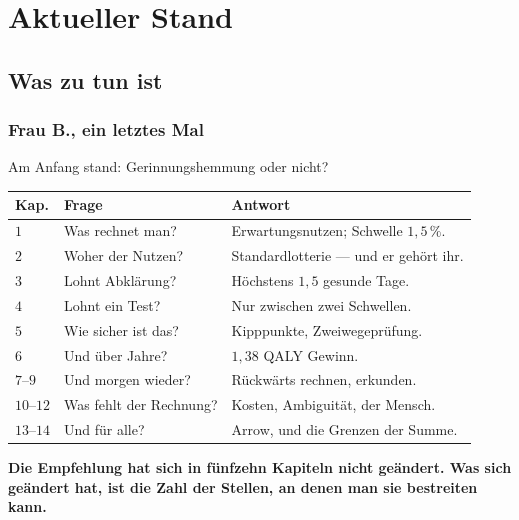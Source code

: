 \part{Aktueller Stand}

\chapter{Was zu tun ist}

\section{Frau B., ein letztes Mal}

\begin{merksatz}
Am Anfang stand: Gerinnungshemmung oder nicht?

\begin{center}
{\small
\renewcommand{\arraystretch}{1.5}
\begin{tabular}{@{}P{1.2cm}P{3.4cm}P{3.6cm}@{}}
\toprule
\textbf{Kap.} & \textbf{Frage} & \textbf{Antwort}\\
\midrule
$1$ & Was rechnet man? & Erwartungsnutzen; Schwelle $1{,}5\,\%$.\\
$2$ & Woher der Nutzen? & Standardlotterie --- und er gehört ihr.\\
$3$ & Lohnt Abklärung? & Höchstens $1{,}5$ gesunde Tage.\\
$4$ & Lohnt ein Test? & Nur zwischen zwei Schwellen.\\
$5$ & Wie sicher ist das? & Kipppunkte, Zweiwegeprüfung.\\
$6$ & Und über Jahre? & $1{,}38$ QALY Gewinn.\\
$7$--$9$ & Und morgen wieder? & Rückwärts rechnen, erkunden.\\
$10$--$12$ & Was fehlt der Rechnung? & Kosten, Ambiguität, der Mensch.\\
$13$--$14$ & Und für alle? & Arrow, und die Grenzen der Summe.\\
\bottomrule
\end{tabular}}
\end{center}

\begin{center}
\begin{minipage}{0.9\textwidth}
\textbf{Die Empfehlung hat sich in fünfzehn Kapiteln nicht geändert. Was sich geändert hat, ist die Zahl der Stellen, an denen man sie bestreiten kann.}
\end{minipage}
\end{center}
\end{merksatz}

